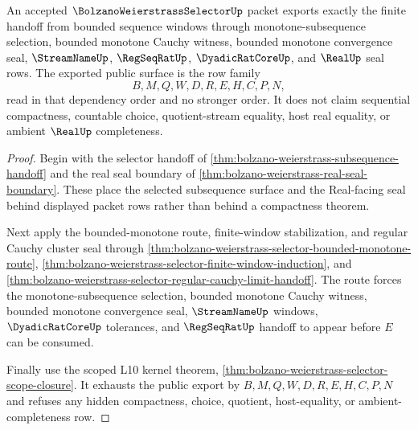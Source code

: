 \begin{theorem}
\label{thm:bolzano-weierstrass-selector-public-export}
An accepted $\BolzanoWeierstrassSelectorUp$ packet exports exactly the finite handoff from bounded sequence windows through monotone-subsequence selection, bounded monotone Cauchy witness, bounded monotone convergence seal, $\StreamNameUp$, $\RegSeqRatUp$, $\DyadicRatCoreUp$, and $\RealUp$ seal rows. The exported public surface is the row family
$$
B,M,Q,W,D,R,E,H,C,P,N,
$$
read in that dependency order and no stronger order. It does not claim sequential compactness, countable choice, quotient-stream equality, host real equality, or ambient $\RealUp$ completeness.
\end{theorem}
\begin{proof}
Begin with the selector handoff of \autoref{thm:bolzano-weierstrass-subsequence-handoff} and the real seal boundary of \autoref{thm:bolzano-weierstrass-real-seal-boundary}. These place the selected subsequence surface and the Real-facing seal behind displayed packet rows rather than behind a compactness theorem.

Next apply the bounded-monotone route, finite-window stabilization, and regular Cauchy cluster seal through \autoref{thm:bolzano-weierstrass-selector-bounded-monotone-route}, \autoref{thm:bolzano-weierstrass-selector-finite-window-induction}, and \autoref{thm:bolzano-weierstrass-selector-regular-cauchy-limit-handoff}. The route forces the monotone-subsequence selection, bounded monotone Cauchy witness, bounded monotone convergence seal, $\StreamNameUp$ windows, $\DyadicRatCoreUp$ tolerances, and $\RegSeqRatUp$ handoff to appear before $E$ can be consumed.

Finally use the scoped L10 kernel theorem, \autoref{thm:bolzano-weierstrass-selector-scope-closure}. It exhausts the public export by $B,M,Q,W,D,R,E,H,C,P,N$ and refuses any hidden compactness, choice, quotient, host-equality, or ambient-completeness row.
\end{proof}


